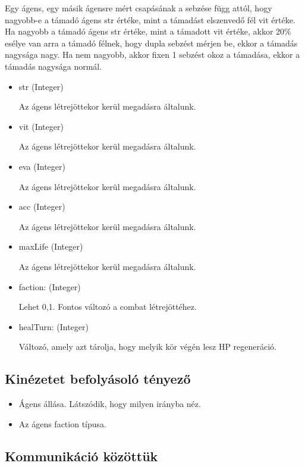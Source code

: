 Egy ágens, egy másik ágensre mért csapásának a sebzése függ attól, hogy nagyobb-e a támadó ágens str értéke, mint a támadást elszenvedő fél vit értéke.
Ha nagyobb a támadó ágens str értéke, mint a támadott vit értéke, akkor 20\% esélye van arra a támadó félnek, hogy dupla sebzést mérjen be, ekkor a támadás nagysága nagy.
Ha nem nagyobb, akkor fixen 1 sebzést okoz a támadása, ekkor a támadás nagysága normál.


\begin{itemize}
    
    \item str (Integer)
    
    Az ágens létrejöttekor kerül megadásra általunk.
    \item vit (Integer)
    
    Az ágens létrejöttekor kerül megadásra általunk.
    \item eva (Integer)
    
    Az ágens létrejöttekor kerül megadásra általunk.
    \item acc (Integer)
    
    Az ágens létrejöttekor kerül megadásra általunk.
    \item maxLife (Integer)
    
    Az ágens létrejöttekor kerül megadásra általunk.
    \item faction: (Integer)
    
    Lehet 0,1. Fontos változó a combat létrejöttéhez.
    \item healTurn: (Integer)
    
    Változó, amely azt tárolja, hogy melyik kör végén lesz HP regeneráció.
\end{itemize}

\subsection{Kinézetet befolyásoló tényező}

\begin{itemize}
    \item Ágens állása. Látszódik, hogy milyen irányba néz.
    \item Az ágens faction típusa.
\end{itemize}

\subsection{Kommunikáció közöttük}

